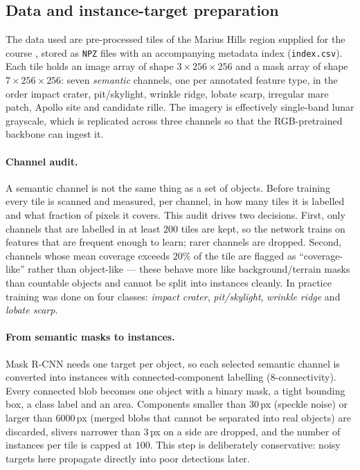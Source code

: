 \documentclass{aa}
\begin{document}
\subsection{Data and instance-target preparation}
\label{sec:data}
The data used are pre-processed tiles of the Marius Hills region supplied
for the course \citep{mariusdata}, stored as \texttt{NPZ} files with an
accompanying metadata index (\texttt{index.csv}). Each tile holds an image array
of shape $3\times256\times256$ and a mask array of shape $7\times256\times256$:
seven \emph{semantic} channels, one per annotated feature type, in the order
impact crater, pit/skylight, wrinkle ridge, lobate scarp, irregular mare patch,
Apollo site and candidate rille. The imagery is effectively single-band lunar
grayscale, which is replicated across three channels so that the RGB-pretrained
backbone can ingest it.

\paragraph{Channel audit.}
A semantic channel is not the same thing as a set of objects. Before training every
tile is scanned and measured, per channel, in how many tiles it is labelled and
what fraction of pixels it covers. This audit drives two decisions. First, only
channels that are labelled in at least $200$ tiles are kept, so the network trains on
features that are frequent enough to learn; rarer channels are dropped. Second,
channels whose mean coverage exceeds $20\%$ of the tile are flagged as ``coverage-like''
rather than object-like --- these behave more like background/terrain masks than
countable objects and cannot be split into instances cleanly. In practice training was
done on four classes: \emph{impact crater}, \emph{pit/skylight}, \emph{wrinkle ridge}
and \emph{lobate scarp}.

\paragraph{From semantic masks to instances.}
Mask R-CNN needs one target per object, so each selected semantic channel is converted
into instances with connected-component labelling (8-connectivity). Every connected
blob becomes one object with a binary mask, a tight bounding box, a class label and
an area. Components smaller than $30$\,px (speckle noise) or larger than
$6000$\,px (merged blobs that cannot be separated into real objects) are discarded,
slivers narrower than $3$\,px on a side are dropped, and the number of instances per
tile is capped at $100$. This step is deliberately conservative: noisy targets here
propagate directly into poor detections later.
\end{document}
